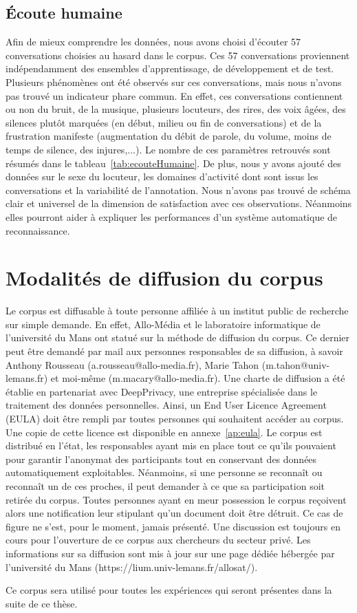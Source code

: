 \subsection{Écoute humaine}
Afin de mieux comprendre les données, nous avons choisi d'écouter 57 conversations choisies au hasard dans le corpus. Ces 57 conversations proviennent indépendamment des ensembles d'apprentissage, de développement et de test.
Plusieurs phénomènes ont été observés sur ces conversations, mais nous n'avons pas trouvé un indicateur phare commun. En effet, ces conversations contiennent ou non du bruit, de la musique, plusieurs locuteurs, des rires, des voix âgées, des silences plutôt marquées (en début, milieu ou fin de conversations) et de la frustration manifeste (augmentation du débit de parole, du volume, moins de temps de silence, des injures,...). Le nombre de ces paramètres retrouvés sont résumés dans le tableau~\ref{tab:ecouteHumaine}. De plus, nous y avons ajouté des données sur le sexe du locuteur, les domaines d'activité dont sont issus les conversations et la variabilité de l'annotation.
Nous n'avons pas trouvé de schéma clair et universel de la dimension de satisfaction avec ces observations. Néanmoins elles pourront aider à expliquer les performances d'un système automatique de reconnaissance.



\section{Modalités de diffusion du corpus}
Le corpus est diffusable à toute personne affiliée à un institut public de recherche sur simple demande. En effet, Allo-Média et le laboratoire informatique de l'université du Mans ont statué sur la méthode de diffusion du corpus.
Ce dernier peut être demandé par mail aux personnes responsables de sa diffusion, à savoir Anthony Rousseau (a.rousseau@allo-media.fr), Marie Tahon (m.tahon@univ-lemans.fr) et moi-même (m.macary@allo-media.fr). Une charte de diffusion a été établie en partenariat avec DeepPrivacy, une entreprise spécialisée dans le traitement des données personnelles. Ainsi, un End User Licence Agreement (EULA) doit être rempli par toutes personnes qui souhaitent accéder au corpus. Une copie de cette licence est disponible en annexe~\ref{ap:eula}.
Le corpus est distribué en l'état, les responsables ayant mis en place tout ce qu'ils pouvaient pour garantir l'anonymat des participants tout en conservant des données automatiquement exploitables. Néanmoins, si une personne se reconnaît ou reconnaît un de ces proches, il peut demander à ce que sa participation soit retirée du corpus.
Toutes personnes ayant en meur possession le corpus reçoivent alors une notification leur stipulant qu'un document doit être détruit. Ce cas de figure ne s'est, pour le moment, jamais présenté.
Une discussion est toujours en cours pour l'ouverture de ce corpus aux chercheurs du secteur privé. Les informations sur sa diffusion sont mis à jour sur une page dédiée hébergée par l'université du Mans (https://lium.univ-lemans.fr/allosat/).

Ce corpus sera utilisé pour toutes les expériences qui seront présentes dans la suite de ce thèse.
